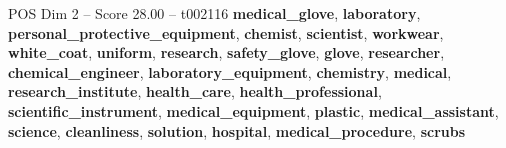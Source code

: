 \begin{textsample}{POS Dim 2 – Score 28.00 – t002116}  \label{ex:f2_pos_030}
\textbf{medical\_glove}, \textbf{laboratory}, \textbf{personal\_protective\_equipment}, \textbf{chemist}, \textbf{scientist}, \textbf{workwear}, \textbf{white\_coat}, \textbf{uniform}, \textbf{research}, \textbf{safety\_glove}, \textbf{glove}, \textbf{researcher}, \textbf{chemical\_engineer}, \textbf{laboratory\_equipment}, \textbf{chemistry}, \textbf{medical}, \textbf{research\_institute}, \textbf{health\_care}, \textbf{health\_professional}, \textbf{scientific\_instrument}, \textbf{medical\_equipment}, \textbf{plastic}, \textbf{medical\_assistant}, \textbf{science}, \textbf{cleanliness}, \textbf{solution}, \textbf{hospital}, \textbf{medical\_procedure}, \textbf{scrubs}

\end{textsample}
